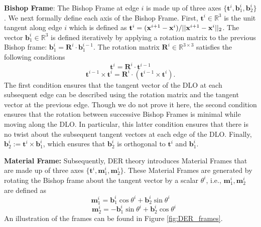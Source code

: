 \textbf{Bishop Frame}: 
The Bishop Frame at edge $i$ is made up of three axes $\{\mathbf{t}^i, \mathbf{b}_1^i, \mathbf{b}_2^i\}$.
We next formally define each axis of the Bishop Frame.
First, $\mathbf{t}^i \in \mathbb{R}^3$ is the unit tangent along edge $i$ which is defined as $\mathbf{t}^i = (\mathbf{x}^{i+1}_{}-\mathbf{x}^{i}_{})/||\mathbf{x}^{i+1}_{}-\mathbf{x}^{i}_{}||_2$.
The vector $\mathbf{b}_1^i \in \mathbb{R}^{3}$ is defined iteratively by applying a rotation matrix to the previous Bishop frame: $\mathbf{b}_1^i = \mathbf{R}^i \cdot \mathbf{b}_1^{i-1}$.
The rotation matrix $\mathbf{R}^i \in \mathbb{R}^{3 \times 3}$ satisfies the following conditions
\begin{equation}
    \label{eq:rotation1}
    \mathbf{t}^i = \mathbf{R}^i \cdot \mathbf{t}^{i-1}
\end{equation}
\begin{equation}
    \label{eq:rotation2}
     \mathbf{t}^{i-1} \times \mathbf{t}^i = \mathbf{R}^i \cdot (\mathbf{t}^{i-1} \times \mathbf{t}^i).
\end{equation}
The first condition ensures that the tangent vector of the DLO at each subsequent edge can be described using the rotation matrix and the tangent vector at the previous edge. 
Though we do not prove it here, the second condition ensures that the rotation between successive Bishop Frames is minimal while moving along the DLO. 
In particular, this latter condition ensures that there is no twist about the subsequent tangent vectors at each edge of the DLO. 
Finally, $\mathbf{b}_2^i := \mathbf{t}^i \times \mathbf{b}_1^i$, which ensures that  $\mathbf{b}_2^i$ is orthogonal to $\mathbf{t}^i$ and $\mathbf{b}_1^i$. 

\textbf{Material Frame:}
Subsequently, DER theory introduces Material Frames that are made up of three axes  $\{\mathbf{t}^i, \mathbf{m}_1^i, \mathbf{m}_2^i\}$. 
These Material Frames are generated by rotating the Bishop frame about the tangent vector by a scalar $\theta^i$, i.e.,  $\mathbf{m}_1^i, \mathbf{m}_2^i$ are defined as
\begin{equation}
    \mathbf{m}_1^i =  \textbf{b}_1^i \cos \theta^i +  \textbf{b}_2^i \sin \theta^i
   \label{eq:m1}
\end{equation}
\begin{equation}
    \quad\mathbf{m}_2^i = -\textbf{b}_1^i \sin \theta^i +  \textbf{b}_2^i\cos \theta^i
   \label{eq:m2}
\end{equation}
An illustration of the frames can be found in Figure \ref{fig:DER_frames}. 

